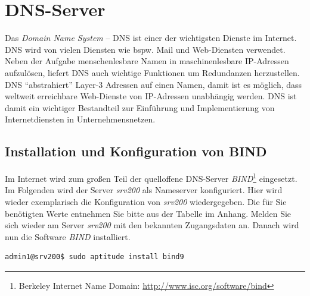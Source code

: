 \section{DNS-Server}
Das \textit{Domain Name System} – DNS ist einer der wichtigsten Dienste im
Internet. DNS wird von vielen Diensten wie bspw. Mail und Web-Diensten
verwendet. Neben der Aufgabe menschenlesbare Namen in maschinenlesbare
IP-Adressen aufzulösen, liefert DNS auch wichtige Funktionen um Redundanzen
herzustellen. DNS "`abstrahiert"' Layer-3 Adressen auf einen Namen, damit ist es
möglich, dass weltweit erreichbare Web-Dienste von IP-Adressen unabhängig
werden. DNS ist damit ein wichtiger Bestandteil zur Einführung und
Implementierung von Internetdiensten in Unternehmensnetzen.

\subsection{Installation und Konfiguration von BIND}
Im Internet wird zum großen Teil der quelloffene DNS-Server
\textit{BIND}\footnote{Berkeley Internet Name
Domain: \url{http://www.isc.org/software/bind}} eingesetzt. Im Folgenden wird
der Server \textit{srv200} als Nameserver konfiguriert. Hier wird wieder
exemplarisch die Konfiguration von \textit{srv200} wiedergegeben. Die für Sie
benötigten Werte entnehmen Sie bitte aus der Tabelle im Anhang. Melden Sie sich
wieder am Server \textit{srv200} mit den bekannten Zugangsdaten an. Danach wird
nun die Software \textit{BIND} installiert.

\begin{lstlisting}
admin1@srv200$ sudo aptitude install bind9
\end{lstlisting}

